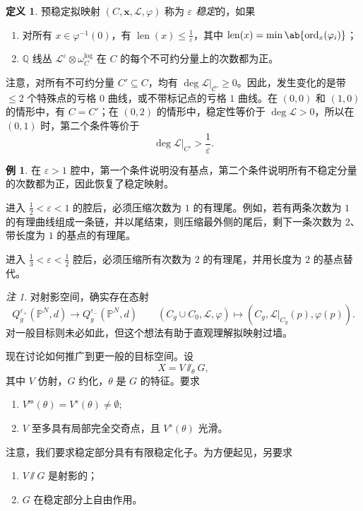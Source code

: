 \documentclass{amsart}
\theoremstyle{definition}
\newtheorem{defn}[thm]{定义}
\newtheorem{exm}[thm]{例}
\theoremstyle{remark}
\newtheorem{rmk}[thm]{注}
\theoremstyle{plain}
\theoremstyle{definition}
\theoremstyle{remark}
\newcommand{\Q}{\mathbb{Q}}
\renewcommand{\P}{\mathbb{P}}
\newcommand{\ep}{\varepsilon}
\newcommand{\mc}[1]{\mathcal{#1}}
\newcommand{\mr}[1]{\mathrm{#1}}
\newcommand{\on}[1]{\operatorname{#1}}
\newcommand{\1}{\mathbf{1}}
\newcommand{\2}{\mathbf{2}}
\newcommand{\3}{\mathbf{3}}
\begin{document}
\begin{defn}
    预稳定拟映射 \((C, \mathbf{x}, \mc{L}, \varphi)\) 称为 \textit{\(\ep\) 稳定}的，如果
    \begin{enumerate}
        \item 对所有 \(x \in \varphi^{-1}(0)\)，有 \(\on{len}(x) \leq \frac{1}{\ep}\)，其中 \(\on{len}(x) = \min \ab\{ \on{ord}_x (\varphi_i)\}\)；
        \item \(\Q\) 线丛 \(\mc{L}^{\ep} \otimes \omega_C^{\log}\) 在 \(C\) 的每个不可约分量上的次数都为正。
    \end{enumerate}
\end{defn}

注意，对所有不可约分量 \(C' \subseteq C\)，均有 \(\deg \mc{L}|_{\mc{C}'} \geq 0\)。因此，发生变化的是带 \(\leq 2\) 个特殊点的亏格 \(0\) 曲线，或不带标记点的亏格 \(1\) 曲线。在 \((0,0)\) 和 \((1,0)\) 的情形中，有 \(C = C'\)；在 \((0,2)\) 的情形中，稳定性等价于 \(\deg \mc{L} > 0\)，所以在 \((0,1)\) 时，第二个条件等价于
\[ \deg \mc{L}|_{C'} > \frac{1}{\ep}. \]

\begin{exm}
    在 \(\ep > 1\) 腔中，第一个条件说明没有基点，第二个条件说明所有不稳定分量的次数都为正，因此恢复了稳定映射。

    进入 \(\frac{1}{2} < \ep < 1\) 的腔后，必须压缩次数为 \(1\) 的有理尾。例如，若有两条次数为 \(1\) 的有理曲线组成一条链，并以尾结束，则压缩最外侧的尾后，剩下一条次数为 \(2\)、带长度为 \(1\) 的基点的有理尾。

    进入 \(\frac{1}{3} < \ep < \frac{1}{2}\) 腔后，必须压缩所有次数为 \(2\) 的有理尾，并用长度为 \(2\) 的基点替代。
\end{exm}

\begin{rmk}
    对射影空间，确实存在态射
    \[ Q_g^{\ep_+}(\P^N, d) \to Q_g^{\ep_-}(\P^N, d) \qquad (C_g \cup C_0, \mc{L}, \varphi) \mapsto (C_g, \mc{L}|_{C_g}(p), \varphi(p)). \]
    对一般目标则未必如此，但这个想法有助于直观理解拟映射过墙。
\end{rmk}

现在讨论如何推广到更一般的目标空间。设
\[ X = V \sslash_{\theta} G, \]
其中 \(V\) 仿射，\(G\) 约化，\(\theta\) 是 \(G\) 的特征。要求
\begin{enumerate}
    \item \(V^{\mr{ss}}(\theta) = V^s(\theta) \neq \emptyset\);
    \item \(V\) 至多具有局部完全交奇点，且 \(V^s(\theta)\) 光滑。
\end{enumerate}
注意，我们要求稳定部分具有有限稳定化子。为方便起见，另要求
\begin{enumerate}
    \item \(V \sslash G\) 是射影的；
    \item \(G\) 在稳定部分上自由作用。
\end{enumerate}
\end{document}
